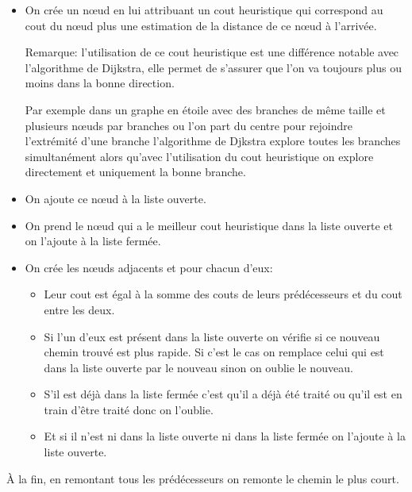    \begin{itemize}
      \item On crée un nœud en lui attribuant un cout heuristique qui
        correspond au cout du nœud plus une estimation de la distance de ce
        nœud à l'arrivée.

        Remarque: l'utilisation de ce cout heuristique est une différence
        notable avec l'algorithme de Dijkstra, elle permet de s'assurer que
        l'on va toujours plus ou moins dans la bonne direction.

        Par exemple dans un graphe en étoile avec des branches de même taille
        et plusieurs nœuds par branches ou l'on part du centre pour rejoindre
        l'extrémité d'une branche l'algorithme de Djkstra explore toutes les
        branches simultanément alors qu'avec l'utilisation du cout heuristique
        on explore directement et uniquement la bonne branche.
      \item On ajoute ce nœud à la liste ouverte.
      \item On prend le nœud qui a le meilleur cout heuristique dans la liste
        ouverte et on l'ajoute à la liste fermée.
      \item On crée les nœuds adjacents et pour chacun d'eux:
        \begin{itemize}
          \item Leur cout est égal à la somme des couts de leurs prédécesseurs
            et du cout entre les deux.
          \item Si l'un d'eux est présent dans la liste ouverte on vérifie si
            ce nouveau chemin trouvé est plus rapide. Si c'est le cas on
            remplace celui qui est dans la liste ouverte par le nouveau sinon
            on oublie le nouveau.
          \item S'il est déjà dans la liste fermée c'est qu'il a déjà été
            traité ou qu'il est en train d'être traité donc on l'oublie.
          \item Et si il n'est ni dans la liste ouverte ni dans la liste fermée
            on l'ajoute à la liste ouverte.
        \end{itemize}
    \end{itemize}
	
    À la fin, en remontant tous les prédécesseurs on remonte le chemin le plus
    court.


